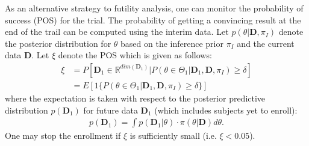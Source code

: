 \documentclass[12pt]{article}
\begin{document}
As an alternative strategy to futility analysis, one can monitor the probability of success (POS) for the trial. The probability of getting a convincing result at the end of the trail can be computed using the interim data. Let $p(\theta|\mathbf{D}, \pi_{I})$ denote the posterior distribution for $\theta$ based on the inference prior $ \pi_{I}$ and the current data $\mathbf{D}$. Let $\xi$ denote the POS which is given as follows:
\begin{align*}
\xi&=P[\mathbf{D}_1\in\mathbb{R}^{dim(\mathbf{D}_1)}|P(\theta\in\Theta_1|\mathbf{D}_1,\mathbf{D},\pi_I)\geq\delta]\\
&=E[1\{P(\theta\in\Theta_1|\mathbf{D}_1,\mathbf{D}, \pi_{I})\geq \delta\}]
\end{align*}
where the expectation is taken with respect to the posterior predictive distribution $p(\mathbf{D}_1)$ for future data $\mathbf{D}_1$ (which includes subjects yet to enroll):
\begin{align*}
p(\mathbf{D}_1)=\int p(\mathbf{D}_1|\theta)\cdot \pi(\theta|\mathbf{D})d\theta.
\end{align*}
One may stop the enrollment if $\xi$ is sufficiently small (i.e. $\xi<0.05$).




%
\end{document}
